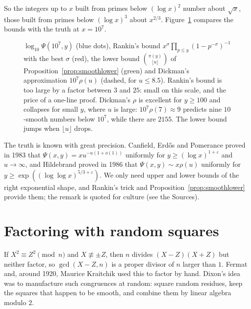 So the integers up to $x$ built from primes below $(\log x)^2$ number about $\sqrt x$, those built from primes below $(\log x)^3$ about $x^{2/3}$. Figure~\ref{fig:smooth} compares the bounds with the truth at $x=10^7$.

\begin{figure}[ht]
\centering{}
\caption{$\log_{10}\Psi(10^7,y)$ (blue dots), Rankin's bound $x^\sigma\prod_{p\le y}(1-p^{-\sigma})^{-1}$ with the best $\sigma$ (red), the lower bound $\binom{\pi(y)}{\lfloor u\rfloor}$ of Proposition~\ref{prop:smoothlower} (green) and Dickman's approximation $10^7\rho(u)$ (dashed, for $u\le8.5$). Rankin's bound is too large by a factor between $3$ and $25$: small on this scale, and the price of a one-line proof. Dickman's $\rho$ is excellent for $y\ge100$ and collapses for small $y$, where $u$ is large: $10^7\rho(7)\approx9$ predicts nine $10$-smooth numbers below $10^7$, while there are $2155$. The lower bound jumps when $\lfloor u\rfloor$ drops.}
\label{fig:smooth}
\end{figure}

\begin{remark}
The truth is known with great precision. Canfield, Erd\H{o}s and Pomerance proved in 1983 that $\Psi(x,y)=xu^{-u(1+o(1))}$ uniformly for $y\ge(\log x)^{1+\varepsilon}$ and $u\to\infty$, and Hildebrand proved in 1986 that $\Psi(x,y)\sim x\rho(u)$ uniformly for $y\ge\exp((\log\log x)^{5/3+\varepsilon})$. We only need upper and lower bounds of the right exponential shape, and Rankin's trick and Proposition~\ref{prop:smoothlower} provide them; the remark is quoted for culture (see the Sources).
\end{remark}

\section{Factoring with random squares}\label{sec:dixon}

If $X^2\equiv Z^2\pmod n$ and $X\not\equiv\pm Z$, then $n$ divides $(X-Z)(X+Z)$ but neither factor, so $\gcd(X-Z,n)$ is a proper divisor of $n$ larger than $1$. Fermat and, around 1920, Maurice Kraitchik used this to factor by hand. Dixon's idea was to manufacture such congruences at random: square random residues, keep the squares that happen to be smooth, and combine them by linear algebra modulo $2$.

